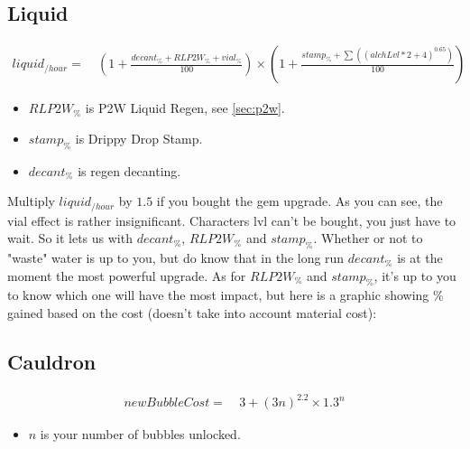         \subsection{Liquid}
            \begin{align*}
                liquid_{/hour} = &\ 
                    \left( 1 + \frac{ decant_\% + RLP2W_\% + vial_\% }{100} \right)
                    \times 
                    \left( 1+ \frac{ stamp_\% + \sum \left( (alchLvl * 2 + 4 )^{0.65} \right) }{100} \right)
            \end{align*}
            \begin{itemize}
                \item $RLP2W_\%$ is P2W Liquid Regen, see \ref{sec:p2w}.
                \item $stamp_\%$ is Drippy Drop Stamp.
                \item $decant_\%$ is regen decanting.
            \end{itemize}
            Multiply $liquid_{/hour}$ by $1.5$ if you bought the gem upgrade.
            \newline
            \newline
            As you can see, the vial effect is rather insignificant. Characters lvl can't be bought, you just have to wait. So it lets us with $decant_\%$, $RLP2W_\%$ and $stamp_\%$. Whether or not to "waste" water is up to you, but do know that in the long run $decant_\%$ is at the moment the most powerful upgrade. 
            \newline
            \newline
            As for $RLP2W_\%$ and $stamp_\%$, it's up to you to know which one will have the most impact, but here is a graphic showing \% gained  based on the cost (doesn't take into account material cost): 
        

        \subsection{Cauldron}
            \begin{align*}
                newBubbleCost = &\ 3 + (3n)^{2.2} \times 1.3^n
            \end{align*}
            \begin{itemize}
                \item $n$ is your number of bubbles unlocked.
            \end{itemize}
            \todo{}

